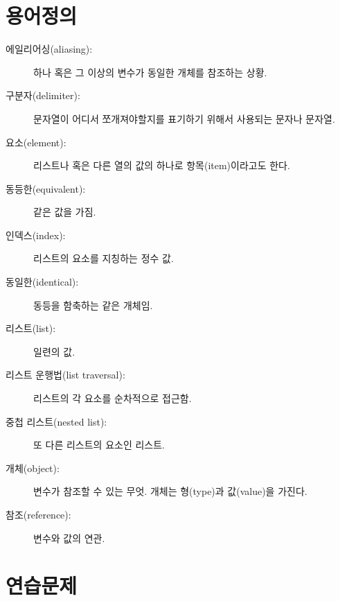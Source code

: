 \section{용어정의}

\begin{description}

\item[에일리어싱(aliasing):] 하나 혹은 그 이상의 변수가 동일한 개체를 참조하는 상황.

\item[구분자(delimiter):] 문자열이 어디서 쪼개져야할지를 표기하기 위해서 사용되는 문자나 문자열.

\item[요소(element):] 리스트나 혹은 다른 열의 값의 하나로 항목(item)이라고도 한다.

\item[동등한(equivalent):] 같은 값을 가짐.

\item[인덱스(index):] 리스트의 요소를 지칭하는 정수 값.

\item[동일한(identical):] 동등을 함축하는 같은 개체임.

\item[리스트(list):] 일련의 값.

\item[리스트 운행법(list traversal):] 리스트의 각 요소를 순차적으로 접근함.

\item[중첩 리스트(nested list):] 또 다른 리스트의 요소인 리스트.

\item[개체(object):] 변수가 참조할 수 있는 무엇. 개체는 형(type)과 값(value)을 가진다.

\item[참조(reference):] 변수와 값의 연관.

\end{description}


\section{연습문제}

